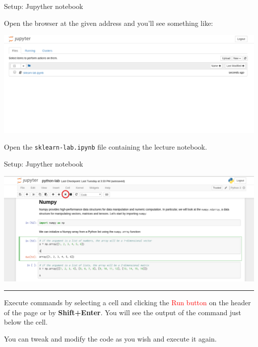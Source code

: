 \documentclass{beamer}
\begin{document}

\begin{frame}{Setup: Jupyther notebook}
\centering

Open the browser at the given address and you'll see something like:

\includegraphics[width=\textwidth]{figures/home}

\vspace{-0.8in}

Open the \texttt{sklearn-lab.ipynb} file containing the lecture notebook.

\end{frame}


\begin{frame}{Setup: Jupyther notebook}
\centering

\includegraphics[width=\textwidth]{figures/click1}

\vspace{0.1in}
\hrule
\vspace{0.1in}

Execute commands by selecting a cell and clicking the \textcolor{red}{Run
button} on the header of the page or by \textbf{Shift+Enter}. You will see the
output of the command just below the cell.

You can tweak and modify the code as you wish and execute it again.

\end{frame}
\end{document}

